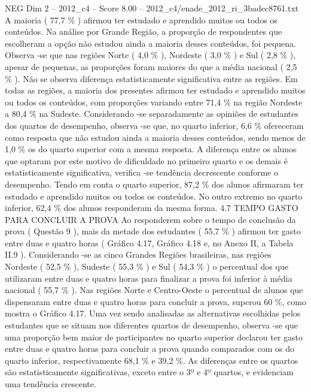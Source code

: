 \begin{textsample}{NEG Dim 2 – 2012\_c4 – Score 8.00 – 2012\_c4/enade\_2012\_ri\_3badec8761.txt}
A maioria ( 77,7 \% ) afirmou ter estudado e aprendido muitos ou todos os conteúdos.
Na análise por Grande Região, a proporção de respondentes que escolheram a opção não estudou ainda a maioria desses conteúdos, foi pequena.
Observa -se que nas regiões Norte ( 4,0 \% ), Nordeste ( 3,0 \% ) e Sul ( 2,8 \% ), apesar de pequenas, as proporções foram maiores do que a média nacional ( 2,5 \% ).
Não se observa diferença estatisticamente significativa entre as regiões.
Em todas as regiões, a maioria dos presentes afirmou ter estudado e aprendido muitos ou todos os conteúdos, com proporções variando entre 71,4 \% na região Nordeste a 80,4 \% na Sudeste.
Considerando -se separadamente as opiniões de estudantes dos quartos de desempenho, observa -se que, no quarto inferior, 6,6 \% ofereceram como resposta que não estudou ainda a maioria desses conteúdos, sendo menos de 1,0 \% os do quarto superior com a mesma resposta.
A diferença entre os alunos que optaram por este motivo de dificuldade no primeiro quarto e os demais é estatisticamente significativa, verifica -se tendência decrescente conforme o desempenho.
Tendo em conta o quarto superior, 87,2 \% dos alunos afirmaram ter estudado e aprendido muitos ou todos os conteúdos.
No outro extremo no quarto inferior, 62,4 \% dos alunos responderam da mesma forma. 4.7 TEMPO GASTO PARA CONCLUIR A PROVA Ao responderem sobre o tempo de conclusão da prova ( Questão 9 ), mais da metade dos estudantes ( 55,7 \% ) afirmou ter gasto entre duas e quatro horas ( Gráfico 4.17, Gráfico 4.18 e, no Anexo II, a Tabela II.9 ).
Considerando -se as cinco Grandes Regiões brasileiras, nas regiões Nordeste ( 52,5 \% ), Sudeste ( 55,3 \% ) e Sul ( 54,3 \% ) o percentual dos que utilizaram entre duas e quatro horas para finalizar a prova foi inferior à média nacional ( 55,7 \% ).
Nas regiões Norte e Centro-Oeste o percentual de alunos que dispensaram entre duas e quatro horas para concluir a prova, superou 60 \%, como mostra o Gráfico 4.17.
Uma vez sendo analisadas as alternativas escolhidas pelos estudantes que se situam nos diferentes quartos de desempenho, observa -se que uma proporção bem maior de participantes no quarto superior declarou ter gasto entre duas e quatro horas para concluir a prova quando comparados com os do quarto inferior, respectivamente 68,1 \% e 39,2 \%.
As diferenças entre os quartos são estatisticamente significativas, exceto entre o 3º e 4º quartos, e evidenciam uma tendência crescente.

\end{textsample}
